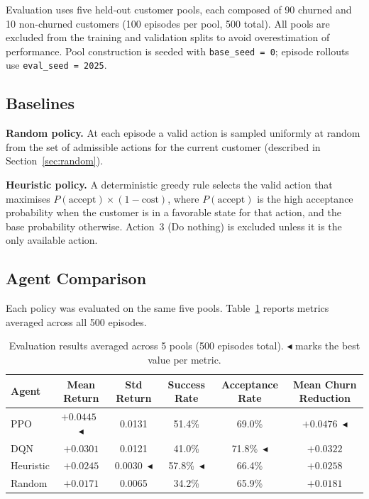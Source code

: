 \documentclass{article}
\begin{document}
Evaluation uses five held-out customer pools, each composed of 90 churned and 10
non-churned customers (100 episodes per pool, 500 total). All pools are excluded from
the training and validation splits to avoid overestimation of performance.
Pool construction is seeded with \texttt{base\_seed = 0}; episode rollouts use
\texttt{eval\_seed = 2025}.

\subsection{Baselines}

\textbf{Random policy.} At each episode a valid action is sampled uniformly at random
from the set of admissible actions for the current customer (described in
Section~\ref{sec:random}).

\textbf{Heuristic policy.} A deterministic greedy rule selects the valid action that
maximises $P(\text{accept}) \times (1 - \text{cost})$, where $P(\text{accept})$ is the
high acceptance probability when the customer is in a favorable state for that action,
and the base probability otherwise. Action~3 (Do nothing) is excluded unless it is the
only available action.

\subsection{Agent Comparison}

Each policy was evaluated on the same five pools.
Table~\ref{tab:comparison} reports metrics averaged across all 500 episodes.

\begin{table}[H]
\centering
\caption{Evaluation results averaged across 5 pools (500 episodes total). $\blacktriangleleft$ marks the best value per metric.}
\label{tab:comparison}
\begin{tabular}{lccccc}
\toprule
\textbf{Agent} & \textbf{Mean Return} & \textbf{Std Return} & \textbf{Success Rate} & \textbf{Acceptance Rate} & \textbf{Mean Churn Reduction} \\
\midrule
PPO       & $+0.0445$~$\blacktriangleleft$ & 0.0131 & 51.4\% & 69.0\% & $+0.0476$~$\blacktriangleleft$ \\
DQN       & $+0.0301$ & 0.0121 & 41.0\% & 71.8\%~$\blacktriangleleft$ & $+0.0322$ \\
Heuristic & $+0.0245$ & 0.0030~$\blacktriangleleft$ & 57.8\%~$\blacktriangleleft$ & 66.4\% & $+0.0258$ \\
Random    & $+0.0171$ & 0.0065 & 34.2\% & 65.9\% & $+0.0181$ \\
\bottomrule
\end{tabular}
\end{table}
\end{document}
